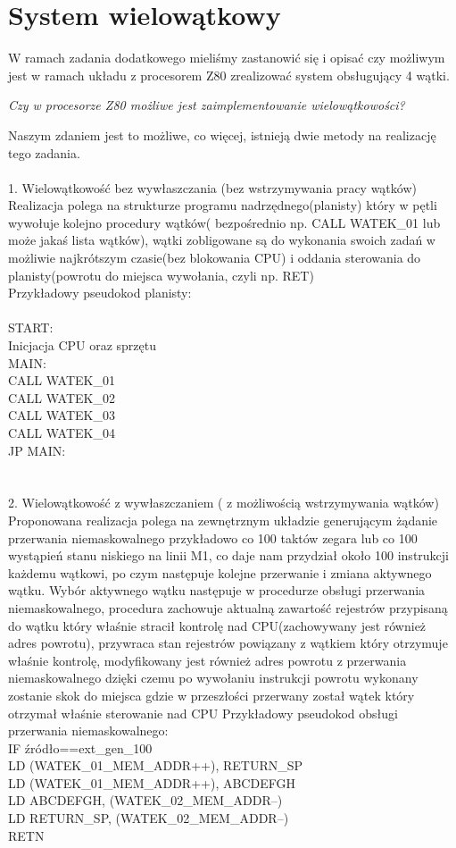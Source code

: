 \documentclass[a4paper,titlepage,11pt,floatssmall]{mwrep}
\begin{document}
\chapter{System wielowątkowy}
\indent{} W ramach zadania dodatkowego mieliśmy zastanowić się i opisać czy możliwym jest w ramach układu z procesorem Z80 zrealizować system obsługujący 4 wątki.
\begin{center}
\textit{Czy w procesorze Z80 możliwe jest zaimplementowanie wielowątkowości?}\\
\end{center}
Naszym zdaniem jest to możliwe, co więcej, istnieją dwie metody na realizację tego zadania.\\\\
1.	Wielowątkowość bez wywłaszczania (bez wstrzymywania pracy wątków)
Realizacja polega na strukturze programu nadrzędnego(planisty) który w pętli wywołuje kolejno procedury wątków( bezpośrednio np. CALL WATEK\_01 lub może jakaś lista wątków), wątki zobligowane są do wykonania swoich zadań w możliwie najkrótszym czasie(bez blokowania CPU) i oddania sterowania do planisty(powrotu do miejsca wywołania, czyli np. RET)\\
Przykładowy pseudokod planisty: \\ \\
START:\\
Inicjacja CPU oraz sprzętu\\ 
MAIN:\\
CALL WATEK\_01\\
CALL WATEK\_02\\
CALL WATEK\_03\\
CALL WATEK\_04\\
JP MAIN: \\
\\
\\
2.  Wielowątkowość z wywłaszczaniem ( z możliwością wstrzymywania wątków)
Proponowana realizacja polega na zewnętrznym układzie generującym żądanie przerwania niemaskowalnego przykładowo co 100 taktów zegara lub co 100 wystąpień stanu niskiego na linii M1, co daje nam przydział około 100 instrukcji każdemu wątkowi, po czym następuje kolejne przerwanie i zmiana aktywnego wątku.
Wybór aktywnego wątku następuje w procedurze obsługi przerwania niemaskowalnego,  procedura zachowuje aktualną zawartość rejestrów przypisaną do wątku który właśnie stracił kontrolę nad CPU(zachowywany jest również adres powrotu), przywraca stan rejestrów powiązany z wątkiem który otrzymuje właśnie kontrolę, modyfikowany jest również adres powrotu z przerwania niemaskowalnego dzięki czemu po wywołaniu instrukcji powrotu wykonany zostanie skok do miejsca gdzie w przeszłości przerwany został wątek który otrzymał właśnie sterowanie nad CPU
Przykładowy pseudokod obsługi przerwania niemaskowalnego:\\
IF źródło==ext\_gen\_100 \\
LD (WATEK\_01\_MEM\_ADDR++), RETURN\_SP\\
LD (WATEK\_01\_MEM\_ADDR++), ABCDEFGH\\
LD ABCDEFGH, (WATEK\_02\_MEM\_ADDR--)\\
LD RETURN\_SP, (WATEK\_02\_MEM\_ADDR--)\\
RETN\\
\end{document}
